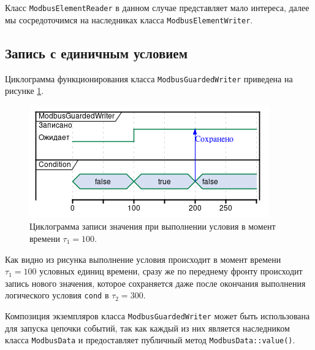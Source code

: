 % 

Класс \texttt{ModbusElementReader} в данном случае представляет мало интереса, далее мы сосредоточимся 
на наследниках класса \texttt{ModbusElementWriter}.


\subsection{Запись с единичным условием}

Циклограмма функционирования класса \texttt{ModbusGuardedWriter} приведена на рисунке \ref{sec:fig:modbus_guarded_writed}.
\begin{center}
    \begin{figure}[h!]
        \includegraphics[width=.8\textwidth,keepaspectratio]{../out/Dissertation/listings/uml/modbus_guarded_writer/modbus_guarded_writer.png}
        \caption{Циклограмма записи значения при выполнении условия в момент времени $\tau_1=100$.}\label{sec:fig:modbus_guarded_writed}
    \end{figure}
\end{center}
Как видно из рисунка выполнение условия происходит в момент времени $\tau_1=100$ условных единиц времени,
сразу же по переднему фронту происходит запись нового значения, которое сохраняется даже после окончания
выполнения логического условия \texttt{cond} в $\tau_2=300$.

Композиция экземпляров класса \texttt{ModbusGuardedWriter} может быть использована для 
запуска цепочки событий, так как каждый из них является  наследником класса \texttt{ModbusData}
и предоставляет публичный метод \texttt{ModbusData::value()}.

